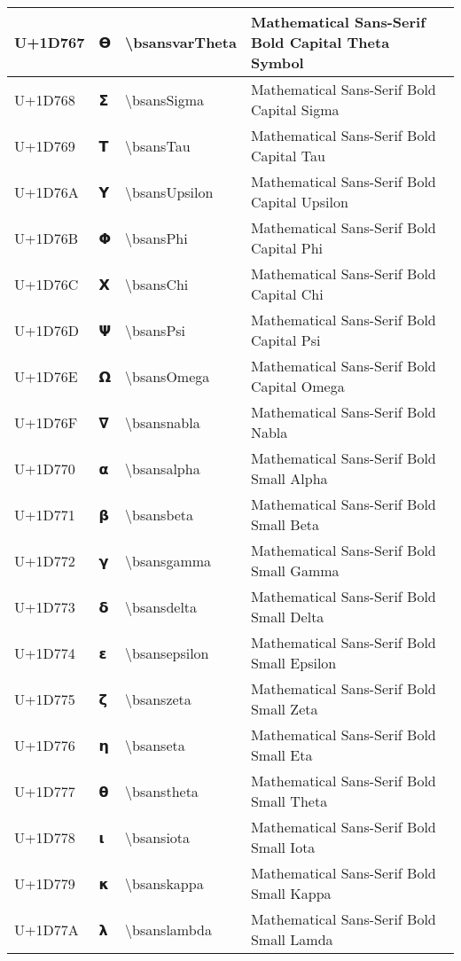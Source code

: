 \begin{table}[h]
\begin{tabulary}{\linewidth}{|L|L|L|L|}
\hline
U+1D767 & 𝝧 & {\textbackslash}bsansvarTheta & Mathematical Sans-Serif Bold Capital Theta Symbol \\
\hline
U+1D768 & 𝝨 & {\textbackslash}bsansSigma & Mathematical Sans-Serif Bold Capital Sigma \\
\hline
U+1D769 & 𝝩 & {\textbackslash}bsansTau & Mathematical Sans-Serif Bold Capital Tau \\
\hline
U+1D76A & 𝝪 & {\textbackslash}bsansUpsilon & Mathematical Sans-Serif Bold Capital Upsilon \\
\hline
U+1D76B & 𝝫 & {\textbackslash}bsansPhi & Mathematical Sans-Serif Bold Capital Phi \\
\hline
U+1D76C & 𝝬 & {\textbackslash}bsansChi & Mathematical Sans-Serif Bold Capital Chi \\
\hline
U+1D76D & 𝝭 & {\textbackslash}bsansPsi & Mathematical Sans-Serif Bold Capital Psi \\
\hline
U+1D76E & 𝝮 & {\textbackslash}bsansOmega & Mathematical Sans-Serif Bold Capital Omega \\
\hline
U+1D76F & 𝝯 & {\textbackslash}bsansnabla & Mathematical Sans-Serif Bold Nabla \\
\hline
U+1D770 & 𝝰 & {\textbackslash}bsansalpha & Mathematical Sans-Serif Bold Small Alpha \\
\hline
U+1D771 & 𝝱 & {\textbackslash}bsansbeta & Mathematical Sans-Serif Bold Small Beta \\
\hline
U+1D772 & 𝝲 & {\textbackslash}bsansgamma & Mathematical Sans-Serif Bold Small Gamma \\
\hline
U+1D773 & 𝝳 & {\textbackslash}bsansdelta & Mathematical Sans-Serif Bold Small Delta \\
\hline
U+1D774 & 𝝴 & {\textbackslash}bsansepsilon & Mathematical Sans-Serif Bold Small Epsilon \\
\hline
U+1D775 & 𝝵 & {\textbackslash}bsanszeta & Mathematical Sans-Serif Bold Small Zeta \\
\hline
U+1D776 & 𝝶 & {\textbackslash}bsanseta & Mathematical Sans-Serif Bold Small Eta \\
\hline
U+1D777 & 𝝷 & {\textbackslash}bsanstheta & Mathematical Sans-Serif Bold Small Theta \\
\hline
U+1D778 & 𝝸 & {\textbackslash}bsansiota & Mathematical Sans-Serif Bold Small Iota \\
\hline
U+1D779 & 𝝹 & {\textbackslash}bsanskappa & Mathematical Sans-Serif Bold Small Kappa \\
\hline
U+1D77A & 𝝺 & {\textbackslash}bsanslambda & Mathematical Sans-Serif Bold Small Lamda \\

\end{tabulary}
\end{table}

